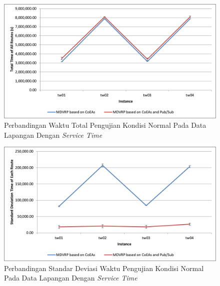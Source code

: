 \begin{figure}[H]
	\centering
	\includegraphics[width=\textwidth]{Resources/Images/test_result_4_real_tw_total_time}
	\caption{Perbandingan Waktu Total Pengujian Kondisi Normal Pada Data Lapangan Dengan \textit{Service Time}}
	\label{fig:test_result_4_real_tw_total_time}
\end{figure}


\begin{figure}[H]
	\centering
	\includegraphics[width=\textwidth]{Resources/Images/test_result_4_real_tw_standard_deviation}
	\caption{Perbandingan Standar Deviasi Waktu Pengujian Kondisi Normal Pada Data Lapangan Dengan \textit{Service Time}}
	\label{fig:test_result_4_real_tw_standard_deviation}
\end{figure}


